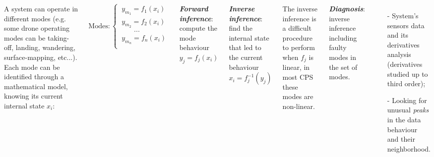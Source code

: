 \documentclass{tikzposter}
\begin{document}
	\begin{columns}
		{
			{
				A system can operate in different modes (e.g. some drone
				operating modes can be taking-off, landing, wandering,
				surface-mapping, etc...).
				Each mode can be identified through a mathematical model,
				knowing its current internal state $x_i$:

				\vspace{10mm}

				$$
				\text{Modes}: 
				\begin{cases}
						\ y_{m_1} = f_1(x_i)	\\
						\ y_{m_2} = f_2(x_i)	\\
						\qquad ...				\\
						\ y_{m_n} = f_n(x_i)	\\
				\end{cases}
				$$

				\vspace{25mm}

				\textit{\textbf{Forward inference}}: compute the mode behaviour
				$y_j = f_j(x_i)$

				\vspace{10mm}

				\textit{\textbf{Inverse inference}}: find the internal state
				that led to the current behaviour $x_i = f^{-1}_{j}(y_j)$
		
				The inverse inference is a difficult procedure to perform when
				$f_j$ is linear, in most CPS these modes are non-linear.

				\vspace{10mm}
		
				\textit{\textbf{Diagnosis}}: inverse inference including faulty
				modes in the set of modes.
			}
		}

		{
			{
				\begin{itemize}
					\item[-]{System's sensors data and its derivatives analysis
						(derivatives studied up to third order);}

					\item[-]{Looking for unusual \textit{peaks} in the data
						behaviour and their neighborhood.}
				\end{itemize}

}}
\end{columns}
\end{document}
